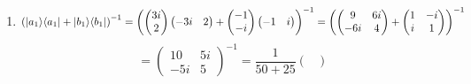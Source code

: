 \documentclass[11pt, letterpaper]{article}
\begin{document}
\begin{enumerate}
		\[
			\left( \braket{a_1}{a_1} +\braket{b_1}{b_1}  \right) ^{-1} =\left( \begin{pmatrix}
			3i & 2
			\end{pmatrix}^*\begin{pmatrix}
			3i \\
			2
			\end{pmatrix}+\begin{pmatrix}
			-1 & -i
			\end{pmatrix}^* \begin{pmatrix}
			-1 \\
			-i
			\end{pmatrix} \right)^{-1}
		\]
		\[
			 =\left( \begin{pmatrix}
			-3i & 2
			\end{pmatrix}\begin{pmatrix}
			3i \\
			2
			\end{pmatrix}+\begin{pmatrix}
			-1 & i
			\end{pmatrix}\begin{pmatrix}
			-1 \\
			-i
			\end{pmatrix} \right) ^{-1} =\left( 9+4+1+1 \right) ^{-1} =\frac{1}{15} 
		.\]
	\item 
		\[
			\left( \lvert a_1\rangle \langle a_1\rvert +\lvert b_1\rangle \langle b_1\rvert  \right) ^{-1} =\left( \begin{pmatrix}
			3i \\
			2
			\end{pmatrix}\begin{pmatrix}
			-3i & 2
			\end{pmatrix}+\begin{pmatrix}
			-1 \\
			-i
			\end{pmatrix}\begin{pmatrix}
			-1 & i
			\end{pmatrix} \right) ^{-1} =\left( \begin{pmatrix}
			9 & 6i \\
			-6i & 4
			\end{pmatrix}+\begin{pmatrix}
			1 & -i \\
			i & 1
			\end{pmatrix} \right) ^{-1} 
		\]
		\[
			=\begin{pmatrix}
				10 & 5i \\
			-5i & 5
			\end{pmatrix}^{-1} =\frac{1}{50+25} \begin{pmatrix}

\end{pmatrix}\]
\end{enumerate}
\end{document}
